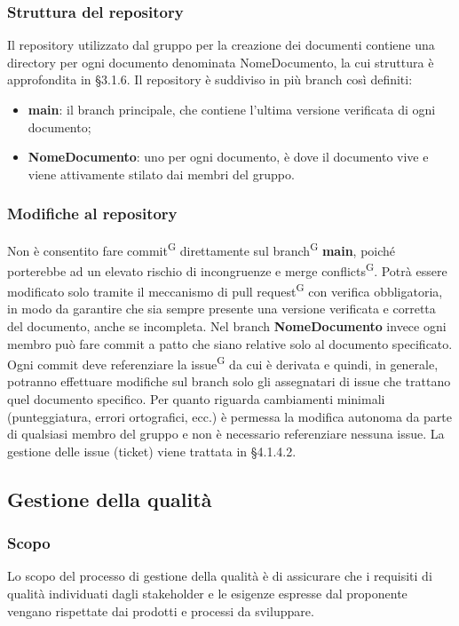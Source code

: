 \subsubsection{Struttura del repository}
Il repository utilizzato dal gruppo per la creazione dei documenti contiene una directory per ogni documento denominata NomeDocumento, la cui struttura è approfondita in §3.1.6.
Il repository è suddiviso in più branch così definiti:
\begin{itemize}
\item \textbf{main}: il branch principale, che contiene l'ultima versione verificata di ogni documento;
\item \textbf{NomeDocumento}: uno per ogni documento, è dove il documento vive e viene attivamente stilato dai membri del gruppo.
\end{itemize}

\subsubsection{Modifiche al repository}
Non è consentito fare commit\textsuperscript{G} direttamente sul branch\textsuperscript{G} \textbf{main}, poiché porterebbe ad un elevato rischio di incongruenze e merge conflicts\textsuperscript{G}. Potrà essere modificato solo tramite il meccanismo di pull request\textsuperscript{G} con verifica obbligatoria, in modo da garantire che sia sempre presente una versione verificata e corretta del documento, anche se incompleta.
Nel branch \textbf{NomeDocumento} invece ogni membro può fare commit a patto che siano relative solo al documento specificato. Ogni commit deve referenziare la issue\textsuperscript{G} da cui è derivata e quindi, in generale, potranno effettuare modifiche sul branch solo gli assegnatari di issue che trattano quel documento specifico. Per quanto riguarda cambiamenti minimali (punteggiatura, errori ortografici, ecc.) è permessa la modifica autonoma da parte di qualsiasi membro del gruppo e non è necessario referenziare nessuna issue.
La gestione delle issue (ticket) viene trattata in §4.1.4.2.

\subsection{Gestione della qualità}
\subsubsection{Scopo}
Lo scopo del processo di gestione della qualità è di assicurare che i requisiti di qualità individuati dagli stakeholder e le esigenze espresse dal proponente vengano rispettate dai prodotti e processi da sviluppare.

